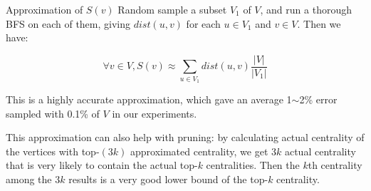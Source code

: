 \begin{frame}{Approximation of $ S(v)$}
Random sample a subset $ V_1$ of $ V$, and run a thorough BFS
on each of them, giving $ dist(u, v)$ for each $u \in V_1 $ and $ v \in V$. Then we
have:

\[ \forall v \in V, S(v) \approx \sum_{u\in V_1} dist(u, v)\dfrac{|V|}{|V_1|} \]

This is a highly accurate approximation, which gave an average
1$\sim$2\% error sampled with 0.1\% of $V$ in our experiments.

This approximation can also help with pruning: by calculating
actual centrality of the vertices with top-$(3k)$ approximated
centrality, we get $3k$ actual centrality that is very likely to
contain the actual top-$k$ centralities. Then the $k$th centrality
among the $3k$ results is a very good lower bound of the top-$k$ centrality.

\end{frame}

